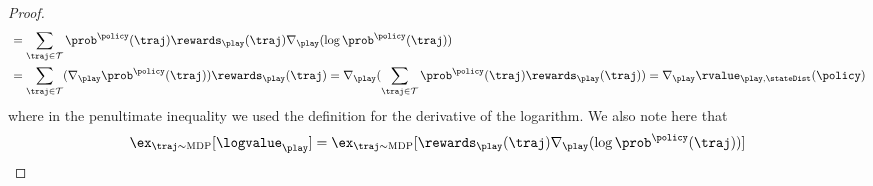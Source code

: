 \begin{proof}
\begin{align}
	&= \sum_{\traj\in\mathcal{T}}\prob^{\policy}\parens{\traj} \rewards_\play\parens{\traj}\nabla_{\play}\parens{\log \prob^{\policy}\parens{\traj}}
	\notag\\
	&=  \sum_{\traj\in\mathcal{T}} \parens{\nabla_{\play} \prob^{\policy}\parens{\traj}}\rewards_\play\parens{\traj}= \nabla_{\play}\parens{\sum_{\traj\in\mathcal{T}}\prob^{\policy}\parens{\traj}\rewards_\play\parens{\traj}}
	=\nabla_{\play}\rvalue_{\play,\stateDist}\parens{\policy}
\end{align}
where in the penultimate inequality we used the definition for the derivative of the logarithm. We also note here that
\begin{equation}
  \ex_{\traj\sim \MDP }\bracks{ \logvalue_\play} = \ex_{\traj\sim \MDP}\bracks{\rewards_\play\parens{\traj} \nabla_{\play}\parens{\log\prob^{\policy}\parens{\traj}}}
\end{equation}



\end{proof}
